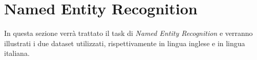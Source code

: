 \section{Named Entity Recognition}
In questa sezione verrà trattato il task di \textit{Named Entity Recognition} e verranno illustrati i due dataset utilizzati, rispettivamente in lingua inglese e in lingua italiana. 




